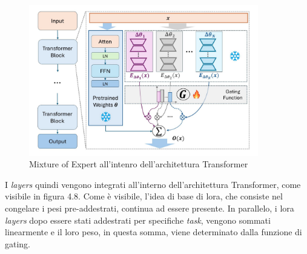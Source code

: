         \begin{figure}[htp]
            \centering        
            \includegraphics[width=10cm]{img/MoE1.pdf}
            \caption{Mixture of Expert all'intenro dell'architettura Transformer}
        \end{figure}

        
        I \textit{layers} quindi vengono integrati all'interno dell'architettura Transformer, come visibile in figura 4.8.
        Come è visibile, l'idea di base di \gls{lora}, che consiste nel congelare i pesi pre-addestrati, continua ad essere presente. In parallelo, i \gls{lora} \textit{layers} dopo essere stati addestrati per specifiche \textit{task}, vengono sommati linearmente e il loro peso, in questa somma, viene determinato dalla funzione di gating.


